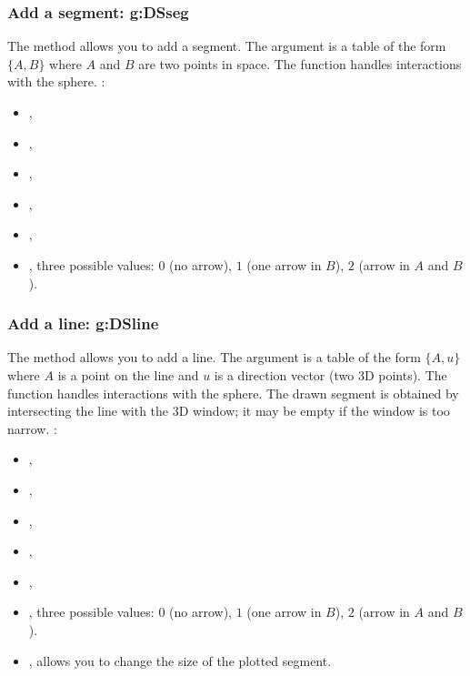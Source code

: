 \subsubsection{ Add a segment: g:DSseg}

The  method allows you to add a segment. The argument  is a table of the form $\{A,B\}$ where $A$ and $B$ are two points in space. The function handles interactions with the sphere. \writeoptions:
\begin{itemize}
    \item {},
    \item {},
    \item {},
    \item {},
    \item {},
    \item {}, three possible values: $0$ (no arrow), $1$ (one arrow in $B$), $2$ (arrow in $A$ and $B$).
\end{itemize}

\subsubsection{Add a line: g:DSline}

The  method allows you to add a line. The argument  is a table of the form $\{A,u\}$ where $A$ is a point on the line and $u$ is a direction vector (two 3D points). The function handles interactions with the sphere. The drawn segment is obtained by intersecting the line with the 3D window; it may be empty if the window is too narrow. \writeoptions:
\begin{itemize}
    \item {},
    \item {},
    \item {},
    \item {},
    \item {},
    \item {}, three possible values: $0$ (no arrow), $1$ (one arrow in $B$), $2$ (arrow in $A$ and $B$).
    \item {}, allows you to change the size of the plotted segment.
\end{itemize}

